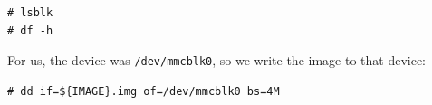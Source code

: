 \begin{lstlisting}[]
# lsblk
# df -h
\end{lstlisting}
\FloatBarrier
\vspace{-5mm}

For us, the device was \texttt{/dev/mmcblk0}, so we write the image to that device:
\begin{lstlisting}[]
# dd if=${IMAGE}.img of=/dev/mmcblk0 bs=4M
\end{lstlisting}
\FloatBarrier
\vspace{-5mm}


